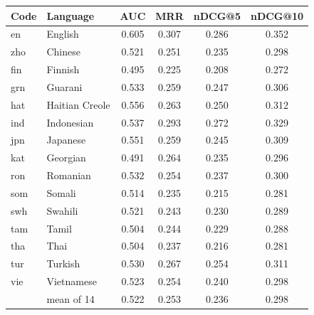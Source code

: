\begin{tabular}{llcccc}
\toprule
Code & Language & AUC & MRR & nDCG@5 & nDCG@10\\
\midrule
en & English & 0.605 & 0.307 & 0.286 & 0.352\\
\midrule
zho & Chinese & 0.521 & 0.251 & 0.235 & 0.298\\
fin & Finnish & 0.495 & 0.225 & 0.208 & 0.272\\
grn & Guarani & 0.533 & 0.259 & 0.247 & 0.306\\
hat & Haitian Creole & 0.556 & 0.263 & 0.250 & 0.312\\
ind & Indonesian & 0.537 & 0.293 & 0.272 & 0.329\\
jpn & Japanese & 0.551 & 0.259 & 0.245 & 0.309\\
kat & Georgian & 0.491 & 0.264 & 0.235 & 0.296\\
ron & Romanian & 0.532 & 0.254 & 0.237 & 0.300\\
som & Somali & 0.514 & 0.235 & 0.215 & 0.281\\
swh & Swahili & 0.521 & 0.243 & 0.230 & 0.289\\
tam & Tamil & 0.504 & 0.244 & 0.229 & 0.288\\
tha & Thai & 0.504 & 0.237 & 0.216 & 0.281\\
tur & Turkish & 0.530 & 0.267 & 0.254 & 0.311\\
vie & Vietnamese & 0.523 & 0.254 & 0.240 & 0.298\\
\midrule
& mean of 14 & 0.522 & 0.253 & 0.236 & 0.298\\
\bottomrule
\end{tabular}
